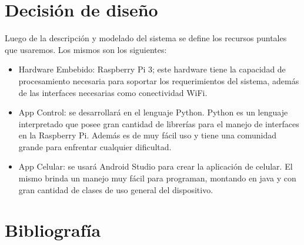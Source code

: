 \documentclass[16pt, article,notitlepage]{article}
\begin{document}
\section{Decisión de diseño}
Luego de la descripción y modelado del sistema se define los recursos puntales que usaremos. Los mismos son los siguientes:

\begin{itemize}
	\item   Hardware Embebido: Raspberry Pi 3; este hardware tiene la capacidad de procesamiento necesaria para soportar los requerimientos del sistema, además de las interfaces necesarias como conectividad WiFi.
	\item App Control: se desarrollará en el lenguaje Python. Python es un lenguaje interpretado que posee gran cantidad de librerías para el manejo de interfaces en la Raspberry Pi. Además es de muy fácil uso y tiene una comunidad grande para enfrentar cualquier dificultad.
	\item   App Celular: se usará Android Studio para crear la aplicación de celular. El mismo brinda un manejo muy fácil para programan, montando en java y con gran cantidad de clases de uso general del dispositivo.
	
\end{itemize}

\section{Bibliografía}



\end{document}
